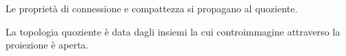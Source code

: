 \begin{fat}
	Le proprietà di connessione e compattezza si propagano al quoziente.
\end{fat}

\begin{ex}
	La topologia quoziente è data dagli insiemi la cui controimmagine attraverso la proiezione è aperta.
\end{ex}

%
%
%
%
%
